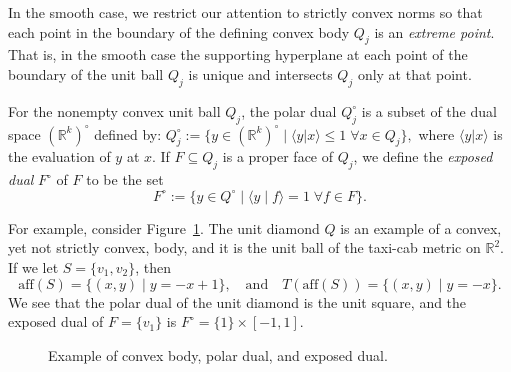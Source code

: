 \documentclass{article}
\theoremstyle{definition}
\newcommand{\aff}{\mathrm{aff}}
\newcommand{\R}{{\mathbb R}}
\begin{document}
In the smooth case, we restrict our attention to strictly convex norms so that each point in the boundary of the defining convex body $Q_j$ is an {\em extreme point}. That is, in the smooth case the supporting hyperplane at each point of the boundary of the unit ball $Q_j$ is unique and intersects $Q_j$ only at that point.

For the nonempty convex unit ball $Q_j$, the polar dual $Q_j^\circ$ is a subset of the dual space $(\R^k)^\circ$ defined by:
$Q_j^\circ := \{y \in (\R^k)^\circ \mid \langle y|x\rangle \leq 1\; \forall x \in Q_j\},$ 
where $\langle y | x\rangle$ is the evaluation of $y$ at $x$. 
If $F \subseteq Q_j$ is a proper face of $Q_j$, we define the {\em exposed dual} $F^\circ$ of $F$ to be the set
\[
F^\circ := \{y \in Q^\circ\mid \langle y \mid f \rangle = 1 \; \forall f \in F\}.
\]

For example, consider Figure~\ref{fig:convex}. The unit diamond $Q$ is an example of a convex, yet not strictly convex, body, and it is the unit ball of the taxi-cab metric on $\R^2$. If we let $S = \{v_1,v_2\}$, then
\[ \aff(S) = \{(x,y)\mid y= -x + 1\}, \quad\text{and}\quad T(\aff(S)) = \{(x,y)\mid y = -x\}.
\]
We see that the polar dual of the unit diamond is the unit square, and the exposed dual of $F = \{v_1\}$ is $F^\circ = \{1\} \times [-1,1]$.

\begin{figure}[h]
\centering
{}
\caption{Example of convex body, polar dual, and exposed dual.}\label{fig:convex}
\end{figure}
\end{document}
